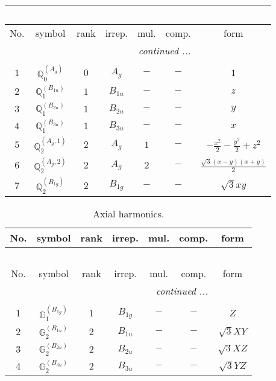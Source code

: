 \documentclass[fleqn,10pt,landscape]{article}
\begin{document}
\begin{itemize}
\begin{center}
\begin{longtable}{ccccccc}
\multicolumn{6}{l}{\tablename\ \thetable{}} \\
 \hline \hline
No. & symbol & rank & irrep. & mul. & comp. & form \\ \hline \endhead

 \hline \hline
\multicolumn{6}{r}{\footnotesize\it continued ...} \\ \endfoot

 \hline \hline
\multicolumn{6}{r}{} \\ \endlastfoot

$ 1 $ & $ \mathbb{Q}_{0}^{(A_{g})} $ & $ 0 $ & $ A_{g} $ & $ - $ & $ - $ & $ 1 $ \\ \hline
$ 2 $ & $ \mathbb{Q}_{1}^{(B_{1u})} $ & $ 1 $ & $ B_{1u} $ & $ - $ & $ - $ & $ z $ \\
$ 3 $ & $ \mathbb{Q}_{1}^{(B_{2u})} $ & $ 1 $ & $ B_{2u} $ & $ - $ & $ - $ & $ y $ \\
$ 4 $ & $ \mathbb{Q}_{1}^{(B_{3u})} $ & $ 1 $ & $ B_{3u} $ & $ - $ & $ - $ & $ x $ \\ \hline
$ 5 $ & $ \mathbb{Q}_{2}^{(A_{g},1)} $ & $ 2 $ & $ A_{g} $ & $ 1 $ & $ - $ & $ - \frac{x^{2}}{2} - \frac{y^{2}}{2} + z^{2} $ \\
$ 6 $ & $ \mathbb{Q}_{2}^{(A_{g},2)} $ & $ 2 $ & $ A_{g} $ & $ 2 $ & $ - $ & $ \frac{\sqrt{3} \left(x - y\right) \left(x + y\right)}{2} $ \\
$ 7 $ & $ \mathbb{Q}_{2}^{(B_{1g})} $ & $ 2 $ & $ B_{1g} $ & $ - $ & $ - $ & $ \sqrt{3} x y $ \\
\end{longtable}
\end{center}
\begin{center}
\renewcommand{\arraystretch}{1.3}
\begin{longtable}{ccccccc}
\caption{Axial harmonics.}
 \\
 \hline \hline
No. & symbol & rank & irrep. & mul. & comp. & form \\ \hline \endfirsthead

\multicolumn{6}{l}{\tablename\ \thetable{}} \\
 \hline \hline
No. & symbol & rank & irrep. & mul. & comp. & form \\ \hline \endhead

 \hline \hline
\multicolumn{6}{r}{\footnotesize\it continued ...} \\ \endfoot

 \hline \hline
\multicolumn{6}{r}{} \\ \endlastfoot

$ 1 $ & $ \mathbb{G}_{1}^{(B_{1g})} $ & $ 1 $ & $ B_{1g} $ & $ - $ & $ - $ & $ Z $ \\ \hline
$ 2 $ & $ \mathbb{G}_{2}^{(B_{1u})} $ & $ 2 $ & $ B_{1u} $ & $ - $ & $ - $ & $ \sqrt{3} X Y $ \\
$ 3 $ & $ \mathbb{G}_{2}^{(B_{2u})} $ & $ 2 $ & $ B_{2u} $ & $ - $ & $ - $ & $ \sqrt{3} X Z $ \\
$ 4 $ & $ \mathbb{G}_{2}^{(B_{3u})} $ & $ 2 $ & $ B_{3u} $ & $ - $ & $ - $ & $ \sqrt{3} Y Z $ \\
\end{longtable}
\end{center}


\end{itemize}
\end{document}
